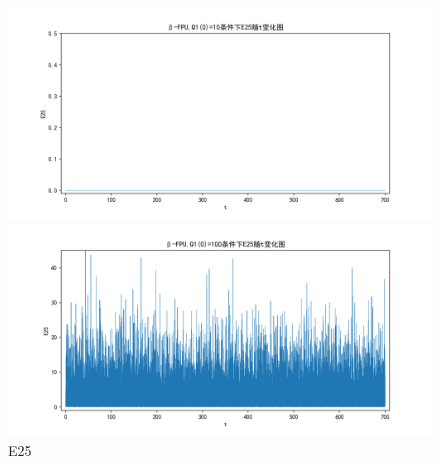 \documentclass[10pt, a4paper]{article}
\begin{document}
    \begin{figure}[H]
        \begin{minipage}[t]{0.49\textwidth}
            \centering
            \includegraphics[width=\textwidth]{./q6_pics/cmp/E25.png}
        \end{minipage}
        \begin{minipage}[t]{0.49\textwidth}
            \centering
            \includegraphics[width=\textwidth]{./q6_pics/exp/E25.png}
        \end{minipage}
        \caption{E25}\label{fig:E25 in q6}
    \end{figure}
\end{document}
